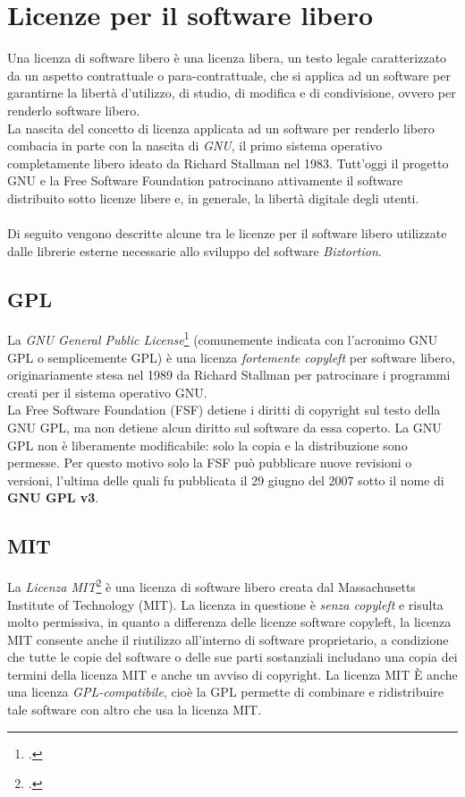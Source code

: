 \section{Licenze per il software libero}
Una licenza di software libero è una licenza libera, un testo legale caratterizzato da un aspetto contrattuale o para-contrattuale, che si applica ad un software per garantirne la libertà d'utilizzo, di studio, di modifica e di condivisione, ovvero per renderlo software libero. \\
La nascita del concetto di licenza applicata ad un software per renderlo libero combacia in parte con la nascita di \textit{GNU}, il primo sistema operativo completamente libero ideato da Richard Stallman nel 1983. Tutt'oggi il progetto GNU e la Free Software Foundation patrocinano attivamente il software distribuito sotto licenze libere e, in generale, la libertà digitale degli utenti. \\ \\
Di seguito vengono descritte alcune tra le licenze per il software libero utilizzate dalle librerie esterne necessarie allo sviluppo del software \textit{Biztortion}.

\subsection{GPL}
\label{sec:gpl}
La \textit{GNU General Public License}\footcite{site:gpl} (comunemente indicata con l'acronimo GNU GPL o semplicemente GPL) è una licenza \textit{fortemente copyleft} per software libero, originariamente stesa nel 1989 da Richard Stallman per patrocinare i programmi creati per il sistema operativo GNU. \\
La Free Software Foundation (FSF) detiene i diritti di copyright sul testo della GNU GPL, ma non detiene alcun diritto sul software da essa coperto. La GNU GPL non è liberamente modificabile: solo la copia e la distribuzione sono permesse. Per questo motivo solo la FSF può pubblicare nuove revisioni o versioni, l'ultima delle quali fu pubblicata il 29 giugno del 2007 sotto il nome di \textbf{GNU GPL v3}.

\subsection{MIT}
La \textit{Licenza MIT}\footcite{site:mit} è una licenza di software libero creata dal Massachusetts Institute of Technology (MIT). 
La licenza in questione è \textit{senza copyleft} e risulta molto permissiva, in quanto a differenza delle licenze software copyleft, la licenza MIT consente anche il riutilizzo all'interno di software proprietario, a condizione che tutte le copie del software o delle sue parti sostanziali includano una copia dei termini della licenza MIT e anche un avviso di copyright. La licenza MIT È anche una licenza \textit{GPL-compatibile}, cioè la GPL permette di combinare e ridistribuire tale software con altro che usa la licenza MIT.

